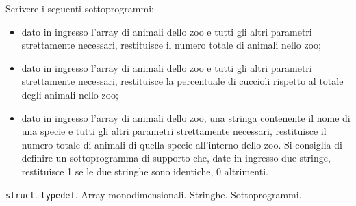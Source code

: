 Scrivere i seguenti sottoprogrammi:
\begin{itemize}
    \item dato in ingresso l'array di animali dello zoo e tutti gli altri parametri strettamente necessari, 
      restituisce il numero totale di animali nello zoo;
    \item dato in ingresso l'array di animali dello zoo e tutti gli altri parametri strettamente necessari, 
      restituisce la percentuale di cuccioli rispetto al totale degli animali nello zoo;
    \item dato in ingresso l'array di animali dello zoo, una stringa contenente il nome di una specie 
      e tutti gli altri parametri strettamente necessari, restituisce il numero totale di animali 
      di quella specie all'interno dello zoo. 
      Si consiglia di definire un sottoprogramma di supporto che, date in ingresso due stringe, restituisce 1
      se le due stringhe sono identiche, 0 altrimenti.
\end{itemize}

\begin{tags}
\texttt{struct}. \texttt{typedef}. Array monodimensionali. Stringhe. Sottoprogrammi.
\end{tags}
